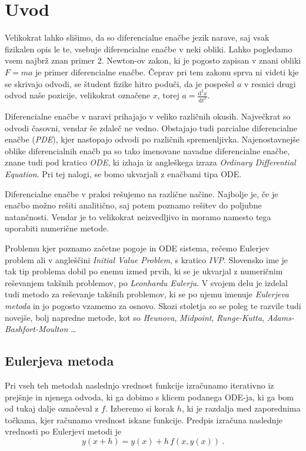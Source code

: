\documentclass{porocilo}
\newcommand{\ddd}{\mathrm{d}}
\newcommand{\Dd}[3][{}]{\frac{\ddd^{#1} #2}{\ddd#3^{#1}}}
\begin{document}
\maketitle

\section{Uvod}
Velikokrat lahko slišimo, da so diferencialne enačbe jezik narave, saj vsak fizikalen opis le te, vsebuje diferencialne enačbe v neki obliki. Lahko pogledamo vsem najbrž znan primer 2. Newton-ov zakon, ki je pogosto zapisan v znani obliki $F = ma$ je primer diferencialne enačbe. Čeprav pri tem zakonu sprva ni videti kje se skrivajo odvodi, se študent fizike hitro poduči, da je pospešel $a$ v resnici drugi odvod naše pozicije, velikokrat označene $x$, torej $a = \Dd[2]{x}{t}$.

Diferencialne enačbe v naravi prihajajo v veliko različnih okusih. Največkrat so odvodi časovni, vendar še zdaleč ne vedno. Obstajajo tudi parcialne diferencialne enačbe (\textit{PDE}), kjer nastopajo odvodi po različnih spremenljivka. Najenostavnejše oblike diferencialnih enačb pa so tako imenovane navadne diferencialne enačbe, znane tudi pod kratico \textit{ODE}, ki izhaja iz angleškega izraza \textit{Ordinary Differential Equation}. Pri tej nalogi, se bomo ukvarjali z enačbami tipa ODE.%

Diferencialne enačbe v praksi rešujemo na različne načine. Najbolje je, če je enačbo možno rešiti analitično, saj potem poznamo rešitev do poljubne natančnosti. Vendar je to velikokrat neizvedljivo in moramo namesto tega uporabiti numerične metode.

Problemu kjer poznamo začetne pogoje in ODE sistema, rečemo Eulerjev problem ali v angleščini \textit{Initial Value Problem}, s kratico \textit{IVP}. Slovensko ime je tak tip problema dobil po enemu izmed prvih, ki se je ukvarjal z numeričnim reševanjem takšnih problemov, po \textit{Leonhardu Eulerju}. V svojem delu je izdelal tudi metodo za reševanje takšnih problemov, ki se po njemu imenuje \textit{Eulerjeva metoda} in jo pogosto vzamemo za osnovo. Skozi stoletja so se poleg te razvile tudi novejše, bolj napredne metode, kot so \textit{Heunova}, \textit{Midpoint}, \textit{Runge-Kutta}, \textit{Adams-Bashfort-Moulton} \dots

\subsection{Eulerjeva metoda}
Pri vseh teh metodah naslednjo vrednost funkcije izračunamo iterativno iz prejšnje in njenega odvoda, ki ga dobimo s klicem podanega ODE-ja, ki ga bom od tukaj dalje označeval z $f$. Izberemo si korak $h$, ki je razdalja med zaporednima točkama, kjer računamo vrednost iskane funkcije. Predpis izračuna naslednje vrednosti po Eulerjevi metodi je
\begin{equation}
    y(x+h) = y(x) + h\,f(x, y(x)) \>.
    \label{eq:Euler}
\end{equation}
\end{document}
